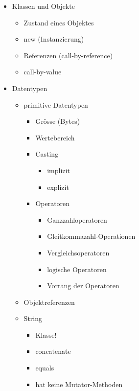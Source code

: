 \begin{itemize}
    \item Klassen und Objekte
    \begin{itemize}
        \item Zustand eines Objektes
        \item new (Instanzierung)
        \item Referenzen (call-by-reference)
        \item call-by-value
    \end{itemize}
    
    \item Datentypen
    \begin{itemize}
        \item primitive Datentypen
        \begin{itemize}
            \item Grösse (Bytes)
            \item Wertebereich
            \item Casting
            \begin{itemize}
                \item implizit
                \item explizit
            \end{itemize}
            \item Operatoren
            \begin{itemize}
                \item Ganzzahloperatoren
                \item Gleitkommazahl-Operationen
                \item Vergleichsoperatoren
                \item logische Operatoren
                \item Vorrang der Operatoren
            \end{itemize}
        \end{itemize}
        \item Objektreferenzen
        \item String
            \begin{itemize}
                \item Klasse!
                \item concatenate
                \item equals
                \item hat keine Mutator-Methoden
            \end{itemize} 
    \end{itemize}
    

\end{itemize}
